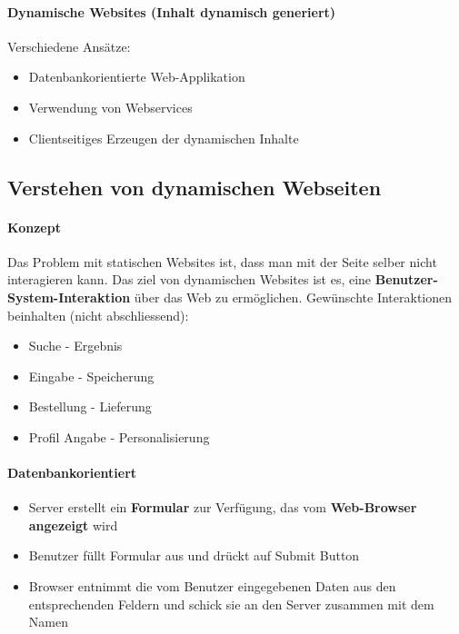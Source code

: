\documentclass[10pt,a4paper]{article}
\begin{document}
\paragraph*{Dynamische Websites (Inhalt dynamisch generiert)} Verschiedene Ansätze:
\begin{itemize}[noitemsep,topsep=0pt,leftmargin=*]
    \item Datenbankorientierte Web-Applikation
    \item Verwendung von Webservices
    \item Clientseitiges Erzeugen der dynamischen Inhalte
\end{itemize}

\subsection{Verstehen von dynamischen Webseiten}
\paragraph*{Konzept}Das Problem mit statischen Websites ist, dass man mit der Seite selber nicht interagieren kann. Das ziel von dynamischen Websites ist es, eine \textbf{Benutzer-System-Interaktion} über das Web zu ermöglichen. Gewünschte Interaktionen beinhalten (nicht abschliessend):
\begin{itemize}[noitemsep,topsep=0pt,leftmargin=*]
    \item Suche - Ergebnis
    \item Eingabe - Speicherung
    \item Bestellung - Lieferung
    \item Profil Angabe - Personalisierung
\end{itemize}
\paragraph*{Datenbankorientiert}
\begin{itemize}[noitemsep,topsep=0pt,leftmargin=*]
    \item Server erstellt ein \textbf{Formular} zur Verfügung, das vom \textbf{Web-Browser angezeigt} wird
    \item Benutzer füllt Formular aus und drückt auf Submit Button
    \item Browser entnimmt die vom Benutzer eingegebenen Daten aus den entsprechenden Feldern und schick sie an den Server zusammen mit dem Namen
\end{itemize}
\end{document}
